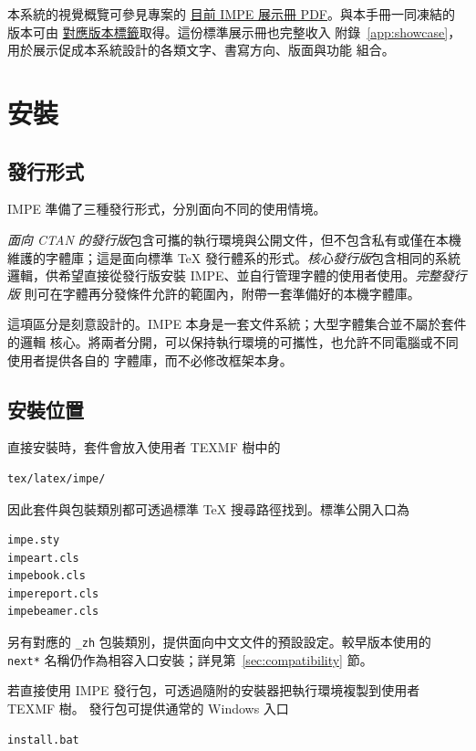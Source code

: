 \documentclass[11pt]{impeart_zh}
\newcommand{\IMPEShowcaseURL}{https://github.com/KelvinYangBK67/IMPE-LaTeX-System/blob/main/_showcase/main.pdf}
\newcommand{\IMPETaggedShowcaseURL}{https://github.com/KelvinYangBK67/IMPE-LaTeX-System/blob/v\IMPEVersion/_showcase/main.pdf}
\begin{document}
本系統的視覺概覽可參見專案的
\href{\IMPEShowcaseURL}{目前 IMPE 展示冊 PDF}。與本手冊一同凍結的版本可由
\href{\IMPETaggedShowcaseURL}{對應版本標籤}取得。這份標準展示冊也完整收入
附錄~\ref{app:showcase}，用於展示促成本系統設計的各類文字、書寫方向、版面與功能
組合。

\section{安裝}

\subsection{發行形式}

IMPE 準備了三種發行形式，分別面向不同的使用情境。

\emph{面向 CTAN 的發行版}包含可攜的執行環境與公開文件，但不包含私有或僅在本機
維護的字體庫；這是面向標準 \TeX{} 發行體系的形式。\emph{核心發行版}包含相同的系統
邏輯，供希望直接從發行版安裝 IMPE、並自行管理字體的使用者使用。\emph{完整發行版}
則可在字體再分發條件允許的範圍內，附帶一套準備好的本機字體庫。

這項區分是刻意設計的。IMPE 本身是一套文件系統；大型字體集合並不屬於套件的邏輯
核心。將兩者分開，可以保持執行環境的可攜性，也允許不同電腦或不同使用者提供各自的
字體庫，而不必修改框架本身。

\subsection{安裝位置}

直接安裝時，套件會放入使用者 TEXMF 樹中的

\begin{verbatim}
tex/latex/impe/
\end{verbatim}

因此套件與包裝類別都可透過標準 \TeX{} 搜尋路徑找到。標準公開入口為

\begin{verbatim}
impe.sty
impeart.cls
impebook.cls
impereport.cls
impebeamer.cls
\end{verbatim}

另有對應的 \texttt{\_zh} 包裝類別，提供面向中文文件的預設設定。較早版本使用的
\texttt{next*} 名稱仍作為相容入口安裝；詳見第~\ref{sec:compatibility} 節。

若直接使用 IMPE 發行包，可透過隨附的安裝器把執行環境複製到使用者 TEXMF 樹。
發行包可提供通常的 Windows 入口

\begin{verbatim}
install.bat
\end{verbatim}
\end{document}
